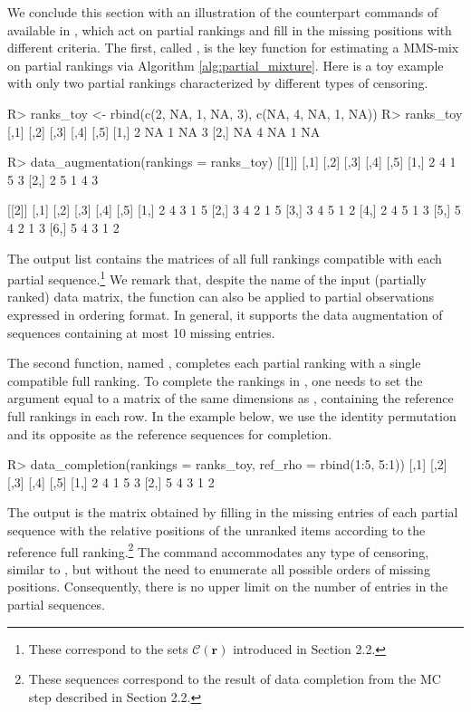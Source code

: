 We conclude this section with an illustration of the counterpart commands of  available in , which act on partial rankings and fill in the missing positions with different criteria.
The first, called , is the key function for estimating a MMS-mix on partial rankings via Algorithm \ref{alg:partial_mixture}. Here is a toy example with only two partial rankings characterized by different types of censoring.
\begin{example}
R> ranks_toy <- rbind(c(2, NA, 1, NA, 3), c(NA, 4, NA, 1, NA))
R> ranks_toy
     [,1] [,2] [,3] [,4] [,5]
[1,]    2   NA    1   NA    3
[2,]   NA    4   NA    1   NA

R> data_augmentation(rankings = ranks_toy)
[[1]]
     [,1] [,2] [,3] [,4] [,5]
[1,]    2    4    1    5    3
[2,]    2    5    1    4    3

[[2]]
     [,1] [,2] [,3] [,4] [,5]
[1,]    2    4    3    1    5
[2,]    3    4    2    1    5
[3,]    3    4    5    1    2
[4,]    2    4    5    1    3
[5,]    5    4    2    1    3
[6,]    5    4    3    1    2
\end{example}
The output list contains the matrices of all full rankings compatible with each partial sequence.\footnote{These correspond to the sets $\mathcal{C}(\bm r)$ introduced in Section 2.2.}
We remark that, despite the name  of the input (partially ranked) data matrix, the function  can also be applied to partial observations expressed in ordering format. In general, it supports the data augmentation of sequences containing at most 10 missing entries.

The second function, named , completes each partial ranking with a single compatible full ranking. To complete the rankings in , one needs to set the  argument equal to a matrix of the same dimensions as , containing the reference full rankings in each row. In the example below, we use the identity permutation and its opposite as the reference sequences for completion.
\begin{example}
R> data_completion(rankings = ranks_toy, ref_rho = rbind(1:5, 5:1)) 
     [,1] [,2] [,3] [,4] [,5]
[1,]    2    4    1    5    3
[2,]    5    4    3    1    2
\end{example}
The output is the matrix obtained by filling in the missing entries of each partial sequence with the relative positions of the unranked items according to the reference full ranking.\footnote{These sequences correspond to the result of data completion from the MC step described in Section 
2.2.}
The  command accommodates any type of censoring, similar to , but without the need to enumerate all possible orders of missing positions. Consequently, there is no upper limit on the number of  entries in the partial sequences. 


